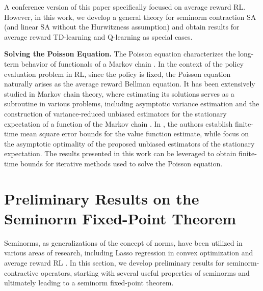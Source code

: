 \documentclass[11 pt]{article}
\begin{document}
	A conference version of this paper \cite{zhang2021finite} specifically focused on average reward RL. However, in this work, we develop a general theory for seminorm contraction SA (and linear SA without the Hurwitzness assumption) and obtain results for average reward TD-learning and Q-learning as special cases.
	
	\textbf{Solving the Poisson Equation.} The Poisson equation characterizes the long-term behavior of functionals of a Markov chain \cite{meyn2012markov}. In the context of the policy evaluation problem in RL, since the policy is fixed, the Poisson equation naturally arises as the average reward Bellman equation. It has been extensively studied in Markov chain theory, where estimating its solutions serves as a subroutine in various problems, including asymptotic variance estimation \cite{agrawal2024markov} and the construction of variance-reduced unbiased estimators for the stationary expectation of a function of the Markov chain \cite{jure2018, douc2024solvingpoissonequationusing, henderson2002approximating}. In \cite{agrawal2024markov}, the authors establish finite-time mean square error bounds for the value function estimate, while \cite{jure2018, douc2024solvingpoissonequationusing, henderson2002approximating} focus on the asymptotic optimality of the proposed unbiased estimators of the stationary expectation. The results presented in this work can be leveraged to obtain finite-time bounds for iterative methods used to solve the Poisson equation.
	
	\section{Preliminary Results on the Seminorm Fixed-Point Theorem}
	\label{sec:seminorm contractive operator}
	Seminorms, as generalizations of the concept of norms, have been utilized in various areas of research, including Lasso regression in convex optimization \cite{boyd2004convex} and average reward RL \cite{puterman2014markov}. In this section, we develop preliminary results for seminorm-contractive operators, starting with several useful properties of seminorms and ultimately leading to a seminorm fixed-point theorem. 
	
	
	
	
\end{document}
